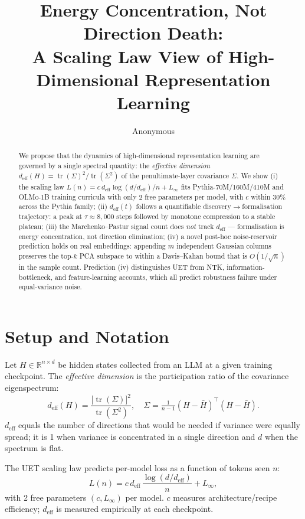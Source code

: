 \documentclass[10pt]{article}
\title{\textbf{Energy Concentration, Not Direction Death:\\
A Scaling Law View of High-Dimensional Representation Learning}}
\author{Anonymous}
\date{}
\newcommand{\deff}{d_{\mathrm{eff}}}
\newcommand{\Linf}{L_{\infty}}
\newcommand{\cC}{c}
\theoremstyle{plain}
\theoremstyle{definition}
\theoremstyle{remark}
\begin{document}
\maketitle

\begin{abstract}
We propose that the dynamics of high-dimensional representation learning are
governed by a single spectral quantity: the \emph{effective dimension}
$\deff(H) = \operatorname{tr}(\Sigma)^2 / \operatorname{tr}(\Sigma^2)$ of
the penultimate-layer covariance $\Sigma$.
We show (i) the scaling law $L(n) = \cC\,\deff\log(d/\deff)/n + \Linf$
fits Pythia-70M/160M/410M and OLMo-1B training curricula with only
2 free parameters per model, with $\cC$ within 30\% across the Pythia family;
(ii) $\deff(t)$ follows a quantifiable discovery$\to$formalisation trajectory:
a peak at $\tau \approx 8{,}000$ steps followed by monotone compression to a
stable plateau;
(iii) the Marchenko--Pastur signal count does \emph{not} track $\deff$ ---
formalisation is energy concentration, not direction elimination;
(iv) a novel post-hoc noise-reservoir prediction holds on real embeddings:
appending $m$ independent Gaussian columns preserves the top-$k$ PCA subspace
to within a Davis--Kahan bound that is $O(1/\sqrt{n})$ in the sample count.
Prediction (iv) distinguishes UET from NTK, information-bottleneck, and
feature-learning accounts, which all predict robustness failure under
equal-variance noise.
\end{abstract}

\section{Setup and Notation}
\label{sec:setup}

Let $H \in \mathbb{R}^{n \times d}$ be hidden states collected from an LLM
at a given training checkpoint.
The \emph{effective dimension} \citep{uet2026} is the participation ratio of
the covariance eigenspectrum:
\[
  \deff(H) = \frac{\bigl[\operatorname{tr}(\Sigma)\bigr]^2}
                  {\operatorname{tr}(\Sigma^2)},
  \quad
  \Sigma = \tfrac{1}{n-1} (H - \bar H)^\top (H - \bar H).
\]
$\deff$ equals the number of directions that would be needed if variance were
equally spread; it is 1 when variance is concentrated in a single direction and
$d$ when the spectrum is flat.

The UET scaling law predicts per-model loss as a function of tokens seen $n$:
\begin{equation}
  L(n) = \cC\,\deff\,\frac{\log(d/\deff)}{n} + \Linf,
  \label{eq:uet}
\end{equation}
with 2 free parameters $(\cC, \Linf)$ per model.
$\cC$ measures architecture/recipe efficiency; $\deff$ is measured empirically
at each checkpoint.
\end{document}
